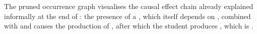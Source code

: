 The pruned occurrence graph visualises the causal effect chain already explained informally at the end of : the presence of a \ccoin, which itself depends on \am, combined with \cpowder and \nomilk causes the production of \espresso, after which the student produces \anger, which is \Forbidden.

